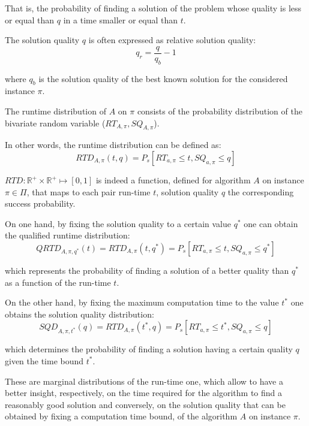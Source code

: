 That is, the probability of finding a solution of the problem whose quality is less or equal than $q$ in a time smaller or equal than $t$.

The solution quality $q$ is often expressed as relative solution quality:
\begin{equation}
  q_r = \frac{q}{q_b} - 1
\end{equation}

where $q_b$ is the solution quality of the best known solution for the considered instance $\pi$.

The runtime distribution of $A$ on $\pi$ consists of the probability distribution of the bivariate random variable ($RT_{A,\pi},SQ_{A,\pi}$).

In other words, the runtime distribution can be defined as: 
\begin{equation}
  RTD_{A,\pi}(t,q) = P_s[RT_{a,\pi} \le t,SQ_{a,\pi} \le q]
\end{equation}

$RTD:\mathbb{R}^{+} \times \mathbb{R}^{+} \mapsto [0,1]$ is indeed a function, defined for algorithm $A$ on instance $\pi \in \Pi$, that maps to each pair run-time $t$, solution quality $q$ the corresponding success probability.


On one hand, by fixing the solution quality to a certain value $q^{*}$ one can obtain the qualified runtime distribution:
\begin{equation}
  QRTD_{A,\pi,q^{*}}(t) = RTD_{A,\pi}(t,q^{*}) = P_s[RT_{a,\pi} \le t,SQ_{a,\pi} \le q^{*}]
\end{equation}

which represents the probability of finding a solution of a better quality than $q^{*}$ as a function of the run-time $t$.


On the other hand, by fixing the maximum computation time to the value $t^{*}$ one obtains the solution quality distribution:
\begin{equation}
  SQD_{A,\pi,t^{*}}(q) = RTD_{A,\pi}(t^{*},q) = P_s[RT_{a,\pi} \le t^{*},SQ_{a,\pi} \le q]
\end{equation}

which determines the probability of finding a solution having a certain quality $q$ given the time bound $t^{*}$.

These are marginal distributions of the run-time one, which allow to have a better insight, respectively, on the time required for the algorithm to find a reasonably good solution and conversely, on the solution quality that can be obtained by fixing a computation time bound, of the algorithm $A$ on instance $\pi$.

